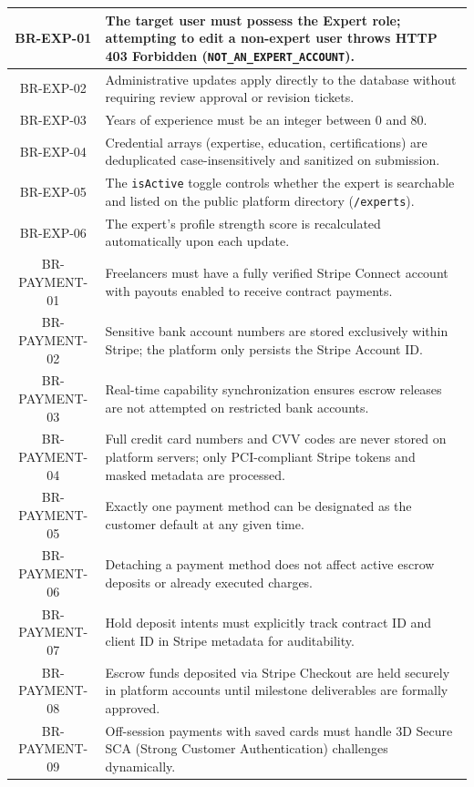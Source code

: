 \begin{longtable}{|c|p{12cm}|}
    BR-EXP-01 & The target user must possess the Expert role; attempting to edit a non-expert user throws HTTP 403 Forbidden (\texttt{NOT\_AN\_EXPERT\_ACCOUNT}). \\ \hline
    BR-EXP-02 & Administrative updates apply directly to the database without requiring review approval or revision tickets. \\ \hline
    BR-EXP-03 & Years of experience must be an integer between 0 and 80. \\ \hline
    BR-EXP-04 & Credential arrays (expertise, education, certifications) are deduplicated case-insensitively and sanitized on submission. \\ \hline
    BR-EXP-05 & The \texttt{isActive} toggle controls whether the expert is searchable and listed on the public platform directory (\texttt{/experts}). \\ \hline
    BR-EXP-06 & The expert's profile strength score is recalculated automatically upon each update. \\ \hline
    BR-PAYMENT-01 & Freelancers must have a fully verified Stripe Connect account with payouts enabled to receive contract payments. \\ \hline
    BR-PAYMENT-02 & Sensitive bank account numbers are stored exclusively within Stripe; the platform only persists the Stripe Account ID. \\ \hline
    BR-PAYMENT-03 & Real-time capability synchronization ensures escrow releases are not attempted on restricted bank accounts. \\ \hline
    BR-PAYMENT-04 & Full credit card numbers and CVV codes are never stored on platform servers; only PCI-compliant Stripe tokens and masked metadata are processed. \\ \hline
    BR-PAYMENT-05 & Exactly one payment method can be designated as the customer default at any given time. \\ \hline
    BR-PAYMENT-06 & Detaching a payment method does not affect active escrow deposits or already executed charges. \\ \hline
    BR-PAYMENT-07 & Hold deposit intents must explicitly track contract ID and client ID in Stripe metadata for auditability. \\ \hline
    BR-PAYMENT-08 & Escrow funds deposited via Stripe Checkout are held securely in platform accounts until milestone deliverables are formally approved. \\ \hline
    BR-PAYMENT-09 & Off-session payments with saved cards must handle 3D Secure SCA (Strong Customer Authentication) challenges dynamically. \\ \hline

\end{longtable}
